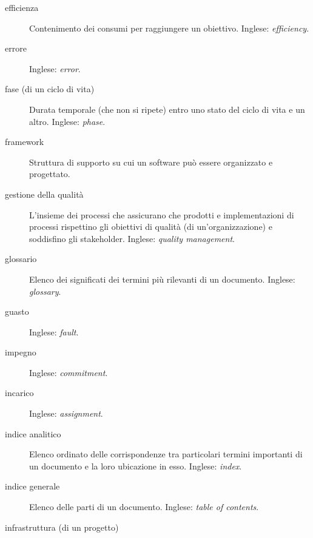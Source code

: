 \documentclass[a4paper]{article}
\begin{document}
\begin{description}
	\item[efficienza] 

			Contenimento dei consumi per raggiungere un obiettivo. Inglese: \emph{efficiency}.
			
	\item[errore] 

			 Inglese: \emph{error}.
			
	\item[fase (di un ciclo di vita)] 

			Durata temporale (che non si ripete) entro uno stato del ciclo di vita e un altro. Inglese: \emph{phase}.
			
	\item[framework] 

			Struttura di supporto su cui un software può essere organizzato e progettato.
			
	\item[gestione della qualità] 

			L'insieme dei processi che assicurano che prodotti e implementazioni di processi rispettino gli obiettivi di qualità (di un'organizzazione) e soddisfino gli stakeholder. Inglese: \emph{quality management}.
			
	\item[glossario] 

			Elenco dei significati dei termini più rilevanti di un documento. Inglese: \emph{glossary}.
			
	\item[guasto] 

			 Inglese: \emph{fault}.
			
	\item[impegno] 

			 Inglese: \emph{commitment}.
			
	\item[incarico] 

			 Inglese: \emph{assignment}.
			
	\item[indice analitico] 

			Elenco ordinato delle corrispondenze tra particolari termini importanti di un documento e la loro ubicazione in esso. Inglese: \emph{index}.
			
	\item[indice generale] 

			Elenco delle parti di un documento. Inglese: \emph{table of contents}.
			
	\item[infrastruttura (di un progetto)] 


\end{description}
\end{document}
